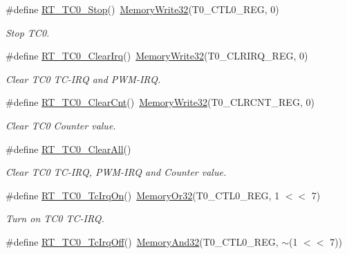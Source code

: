 \begin{DoxyCompactItemize}
\item 
\#define \mbox{\hyperlink{a00041_a7eb236125fa1773036d72e020419f3ad}{R\+T\+\_\+\+T\+C0\+\_\+\+Stop}}()~\mbox{\hyperlink{a00020_ad9953f631a539cfaa35baf94f878b3ec}{Memory\+Write32}}(T0\+\_\+\+C\+T\+L0\+\_\+\+R\+EG, 0)
\begin{DoxyCompactList}\small\item\em Stop T\+C0. \end{DoxyCompactList}\item 
\#define \mbox{\hyperlink{a00041_a8758649b0f3c3401f75970ddeab0a8d9}{R\+T\+\_\+\+T\+C0\+\_\+\+Clear\+Irq}}()~\mbox{\hyperlink{a00020_ad9953f631a539cfaa35baf94f878b3ec}{Memory\+Write32}}(T0\+\_\+\+C\+L\+R\+I\+R\+Q\+\_\+\+R\+EG, 0)
\begin{DoxyCompactList}\small\item\em Clear T\+C0 T\+C-\/\+I\+RQ and P\+W\+M-\/\+I\+RQ. \end{DoxyCompactList}\item 
\#define \mbox{\hyperlink{a00041_a17c2c2161dfc43f81e4e887a0d2b62ee}{R\+T\+\_\+\+T\+C0\+\_\+\+Clear\+Cnt}}()~\mbox{\hyperlink{a00020_ad9953f631a539cfaa35baf94f878b3ec}{Memory\+Write32}}(T0\+\_\+\+C\+L\+R\+C\+N\+T\+\_\+\+R\+EG, 0)
\begin{DoxyCompactList}\small\item\em Clear T\+C0 Counter value. \end{DoxyCompactList}\item 
\#define \mbox{\hyperlink{a00041_a455c100511141b1243e8ee7f756e6553}{R\+T\+\_\+\+T\+C0\+\_\+\+Clear\+All}}()
\begin{DoxyCompactList}\small\item\em Clear T\+C0 T\+C-\/\+I\+RQ, P\+W\+M-\/\+I\+RQ and Counter value. \end{DoxyCompactList}\item 
\#define \mbox{\hyperlink{a00041_a1ff15e860147b3fff582b7603ba7ffa8}{R\+T\+\_\+\+T\+C0\+\_\+\+Tc\+Irq\+On}}()~\mbox{\hyperlink{a00020_a9ea92ebccdef6bdaca4d00210cc7266d}{Memory\+Or32}}(T0\+\_\+\+C\+T\+L0\+\_\+\+R\+EG, 1 $<$$<$ 7)
\begin{DoxyCompactList}\small\item\em Turn on T\+C0 T\+C-\/\+I\+RQ. \end{DoxyCompactList}\item 
\#define \mbox{\hyperlink{a00041_a7434ed75487de93c69569c05430967ae}{R\+T\+\_\+\+T\+C0\+\_\+\+Tc\+Irq\+Off}}()~\mbox{\hyperlink{a00020_a5c1a2bd4c1bd4c2f429d8042a45327ff}{Memory\+And32}}(T0\+\_\+\+C\+T\+L0\+\_\+\+R\+EG, $\sim$(1 $<$$<$ 7))

\end{DoxyCompactItemize}
